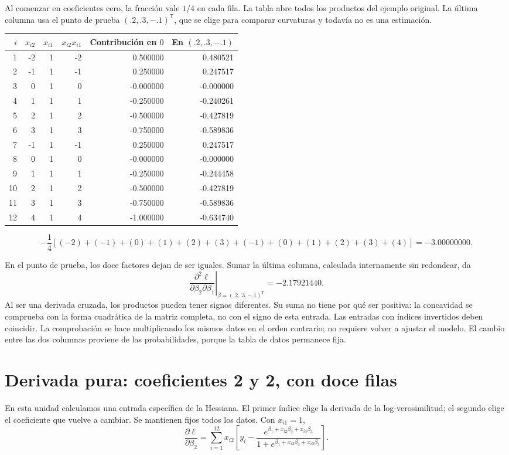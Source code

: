 \documentclass[11pt,a4paper]{article}
\newcommand{\T}{^{\mathsf T}}
\begin{document}
Al comenzar en coeficientes cero, la fracción vale $1/4$ en cada fila.
La tabla abre todos los productos del ejemplo original. La última
columna usa el punto de prueba $(.2,.3,-.1)^\mathsf T$, que se elige
para comparar curvaturas y todavía no es una estimación.
\begin{center}\small
\begin{tabular}{rrrrrr}
\toprule
$i$&$x_{i2}$&$x_{i1}$&$x_{i2}x_{i1}$&Contribución en $0$&En $(.2,.3,-.1)$\\\midrule1&-2&1&-2&0.500000&0.480521\\
2&-1&1&-1&0.250000&0.247517\\
3&0&1&0&-0.000000&-0.000000\\
4&1&1&1&-0.250000&-0.240261\\
5&2&1&2&-0.500000&-0.427819\\
6&3&1&3&-0.750000&-0.589836\\
7&-1&1&-1&0.250000&0.247517\\
8&0&1&0&-0.000000&-0.000000\\
9&1&1&1&-0.250000&-0.244458\\
10&2&1&2&-0.500000&-0.427819\\
11&3&1&3&-0.750000&-0.589836\\
12&4&1&4&-1.000000&-0.634740\\\bottomrule\end{tabular}\end{center}\[
-\frac14\left[(-2)+(-1)+(0)+(1)+(2)+(3)+(-1)+(0)+(1)+(2)+(3)+(4)\right]=-3.00000000.
\]

En el punto de prueba, los doce factores dejan de ser iguales.
Sumar la última columna, calculada internamente sin redondear, da
\[
\left.\frac{\partial^2\ell}{\partial\beta_2\partial\beta_1}\right|_{\beta=(.2,.3,-.1)\T}=-2.17921440.
\]
Al ser una derivada cruzada, los productos pueden tener signos diferentes. Su suma no tiene por qué ser positiva: la concavidad se comprueba con la forma cuadrática de la matriz completa, no con el signo de esta entrada.
Las entradas con índices invertidos deben coincidir.
La comprobación se hace multiplicando los mismos datos en el orden
contrario; no requiere volver a ajustar el modelo.
El cambio entre las dos columnas proviene de las probabilidades,
porque la tabla de datos permanece fija.

\clearpage
\section{Derivada pura: coeficientes 2 y 2, con doce filas}\label{logit23}
En esta unidad calculamos una entrada específica de la Hessiana.
El primer índice elige la derivada de la log-verosimilitud; el segundo
elige el coeficiente que vuelve a cambiar.
Se mantienen fijos todos los datos. Con $x_{i1}=1$,
\[
\frac{\partial\ell}{\partial\beta_2}=\sum_{i=1}^{12}x_{i2}\left[y_i-\frac{e^{\beta_1+x_{i2}\beta_2+x_{i3}\beta_3}}{1+e^{\beta_1+x_{i2}\beta_2+x_{i3}\beta_3}}\right].
\]
\end{document}
